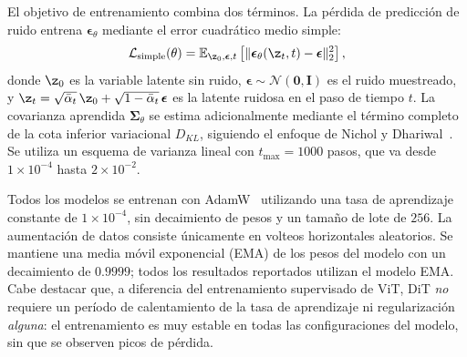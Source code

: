 \documentclass[../../book-main_es.tex]{subfiles}
\begin{document}
El objetivo de entrenamiento combina dos términos. La pérdida de predicción de ruido entrena 
$\boldsymbol{\epsilon}_\theta$ mediante el error cuadrático medio simple:
\begin{equation}
    \mathcal{L}_{\mathrm{simple}}(\theta) = \mathbb{E}_{\z_0, \boldsymbol{\epsilon}, t}\left[\|\boldsymbol{\epsilon}_\theta(\z_t, t) - \boldsymbol{\epsilon}\|_2^2\right],
\end{equation}
donde $\z_0$ es la variable latente sin ruido, $\boldsymbol{\epsilon} \sim \mathcal{N}(\boldsymbol{0}, 
\boldsymbol{I})$ es el ruido muestreado, y 
$\z_t = \sqrt{\bar{\alpha}_t}\,\z_0 + \sqrt {1 - \bar{\alpha}_t}\,\boldsymbol{\epsilon}$ es la latente 
ruidosa en el paso de tiempo $t$. La covarianza aprendida $\boldsymbol{\Sigma}_\theta$ se estima adicionalmente mediante
el término completo de la cota inferior variacional $D_{KL}$, siguiendo el enfoque 
de Nichol y Dhariwal~\citep{nichol2021improved}. Se utiliza un esquema de varianza lineal con 
$t_{\max} = 1000$ pasos, que va desde $1 \times 10^{-4}$ hasta $2 \times 10^{-2}$.

Todos los modelos se entrenan con AdamW~\citep{loshchilov2019decoupled} utilizando una tasa de 
aprendizaje constante de $1 \times 10^{-4}$, sin decaimiento de pesos y un tamaño de lote de $256$. 
La aumentación de datos consiste únicamente en volteos horizontales aleatorios. Se mantiene una media 
móvil exponencial (EMA) de los pesos del modelo con un decaimiento de $0.9999$; todos los resultados 
reportados utilizan el modelo EMA. Cabe destacar que, a diferencia del entrenamiento supervisado de ViT, 
DiT \emph{no} requiere un período de calentamiento de la tasa de aprendizaje ni regularización \emph{alguna}:
el entrenamiento es muy estable en todas las configuraciones del modelo, sin que 
se observen picos de pérdida.
\end{document}
